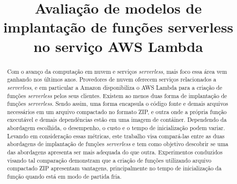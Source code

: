 \documentclass[conference]{IEEEtran}
\begin{document}

\title{Avaliação de modelos de implantação de funções serverless no serviço AWS Lambda}

\author{
\and
{}
}

\maketitle

\begin{abstract}

Com o avanço da computação em nuvem e serviços \textit{serverless}, mais foco essa área vem ganhando nos últimos anos. Provedores de nuvem oferecem serviços relacionados a \textit{serverless}, e em particular a Amazon disponibiliza o AWS Lambda para a criação de funções \textit{serverless} pelos seus clientes. Existem ao menos duas forma de implantação de funções \textit{serverless}. Sendo assim, uma forma encapsula o código fonte e demais arquivos necessários em um arquivo compactado no formato ZIP, e outra onde a própria função executável e demais dependências estão em uma imagem de contâiner. Dependendo da abordagem escolhida, o desempenho, o custo e o tempo de inicialização podem variar. Levando em consideração essas métricas, este trabalho visa compará-las entre as duas abordagens de implantação de funções \textit{serverless} e tem como objetivo descobrir se uma das abordagens apresenta ser mais adequada do que outra. Experimentos conduzidos visando tal comparação demonstram que a criação de funções utilizando arquivo compactado ZIP apresentam vantagens, principalmente no tempo de inicialização da função quando está em modo de partida fria. 
\end{abstract}
\end{document}
